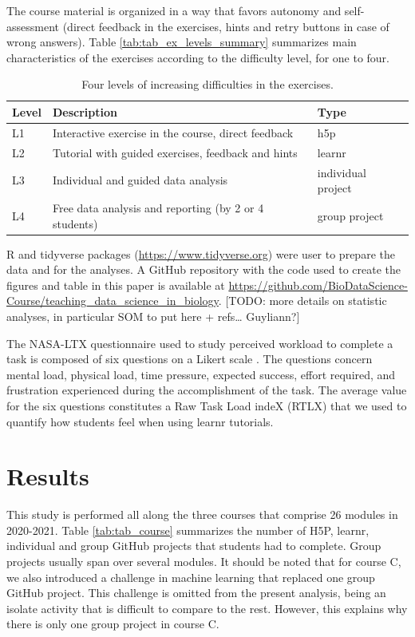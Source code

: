 \documentclass{aims}
\theoremstyle{definition}
\begin{document}
The course material is organized in a way that favors autonomy and
self-assessment (direct feedback in the exercises, hints and retry
buttons in case of wrong answers). Table
\ref {tab:tab_ex_levels_summary} summarizes main characteristics of the
exercises according to the difficulty level, for one to four.

\begin{table}

\caption{\label{tab:tab_ex_levels_summary}\label{tab:tab_ex_levels} Four levels of increasing difficulties in the exercises.}
\centering
\begin{tabular}[t]{l|l|l}
\hline
Level & Description & Type\\
\hline
L1 & Interactive exercise in the course, direct feedback & h5p\\
\hline
L2 & Tutorial with guided exercises, feedback and hints & learnr\\
\hline
L3 & Individual and guided data analysis & individual project\\
\hline
L4 & Free data analysis and reporting (by 2 or 4 students) & group project\\
\hline
\end{tabular}
\end{table}

R and tidyverse packages (\url{https://www.tidyverse.org}) were user to
prepare the data and for the analyses. A GitHub repository with the code
used to create the figures and table in this paper is available at
\url{https://github.com/BioDataScience-Course/teaching_data_science_in_biology}.
{[}TODO: more details on statistic analyses, in particular SOM to put
here + refs\ldots{} Guyliann?{]}

The NASA-LTX questionnaire used to study perceived workload to complete
a task is composed of six questions on a Likert scale \cite{Hart1988}.
The questions concern mental load, physical load, time pressure,
expected success, effort required, and frustration experienced during
the accomplishment of the task. The average value for the six questions
constitutes a Raw Task Load indeX (RTLX) \cite{Byers1989} that we used
to quantify how students feel when using learnr tutorials.

\hypertarget{results}{%
\section{Results}\label{results}}

This study is performed all along the three courses that comprise 26
modules in 2020-2021. Table \ref {tab:tab_course} summarizes the number
of H5P, learnr, individual and group GitHub projects that students had
to complete. Group projects usually span over several modules. It should
be noted that for course C, we also introduced a challenge in machine
learning that replaced one group GitHub project. This challenge is
omitted from the present analysis, being an isolate activity that is
difficult to compare to the rest. However, this explains why there is
only one group project in course C.
\end{document}
